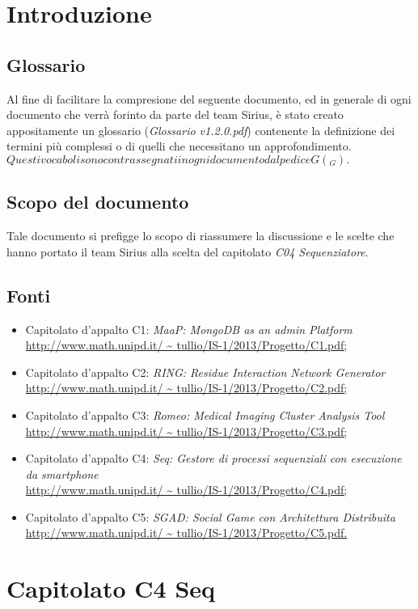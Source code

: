 \section{Introduzione}
\subsection{Glossario}
Al fine di facilitare la compresione del seguente documento, ed in generale di ogni documento che verrà forinto da parte del team Sirius, è stato creato appositamente un glossario (\textit{Glossario v1.2.0.pdf}) contenente la definizione dei termini più complessi o di quelli che necessitano un approfondimento.
$ Questi vocaboli sono contrassegnati in ogni documento dal pedice G (_G).
$ \subsection{Scopo del documento}
Tale documento si prefigge lo scopo di riassumere la discussione e le scelte che hanno portato il team Sirius alla scelta del capitolato \textit{C04 Sequenziatore}.
\subsection{Fonti}
\begin{itemize}
\item Capitolato d'appalto C1:\textit{ MaaP: MongoDB as an admin Platform} \\
\url{http://www.math.unipd.it/ ~ tullio/IS-1/2013/Progetto/C1.pdf;}
\item  Capitolato d'appalto C2: \textit{RING: Residue Interaction Network Generator}\\
\url{http://www.math.unipd.it/ ~ tullio/IS-1/2013/Progetto/C2.pdf;}
\item  Capitolato d'appalto C3: \textit{Romeo: Medical Imaging Cluster Analysis Tool}\\
\url{http://www.math.unipd.it/ ~ tullio/IS-1/2013/Progetto/C3.pdf;}
\item Capitolato d'appalto C4: \textit{Seq: Gestore di processi sequenziali con esecuzione da smartphone}\\
\url{http://www.math.unipd.it/ ~ tullio/IS-1/2013/Progetto/C4.pdf;}
\item Capitolato d'appalto C5:  \textit{SGAD: Social Game con Architettura Distribuita}
\url{http://www.math.unipd.it/ ~ tullio/IS-1/2013/Progetto/C5.pdf.}
\end{itemize}
\section{Capitolato C4 Seq}

